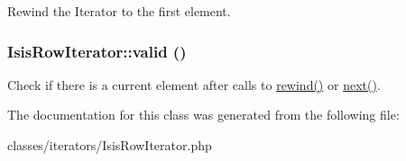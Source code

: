 Rewind the Iterator to the first element. \hypertarget{classIsisRowIterator_a69cb2b1c6e8feaffcfe65363a9178b72}{
\subsubsection[{valid}]{\setlength{\rightskip}{0pt plus 5cm}IsisRowIterator::valid ()}}
\label{classIsisRowIterator_a69cb2b1c6e8feaffcfe65363a9178b72}
Check if there is a current element after calls to \hyperlink{classIsisRowIterator_a5ef72f942cc738bf24cf251018c28edf}{rewind()} or \hyperlink{classIsisRowIterator_ad084ce947a265969f738e7d7dc8a1853}{next()}. 

The documentation for this class was generated from the following file:\begin{DoxyCompactItemize}
\item 
classes/iterators/IsisRowIterator.php\end{DoxyCompactItemize}
